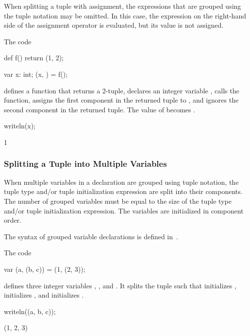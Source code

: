 When splitting a tuple with assignment, the expressions that are
grouped using the tuple notation may be omitted.  In this case, the
expression on the right-hand side of the assignment operator is
evaluated, but its value is not assigned.

\begin{example}
\begin{chapelpre}
\end{chapelpre}
The code
\begin{chapel}
def f()
  return (1, 2);

var x: int;
(x, ) = f();
\end{chapel}
defines a function that returns a 2-tuple, declares an integer
variable , calls the function, assigns the first component in
the returned tuple to , and ignores the second component in
the returned tuple.  The value of  becomes .
\begin{chapelpost}
writeln(x);
\end{chapelpost}
\begin{chapeloutput}
1
\end{chapeloutput}
\end{example}

\subsubsection{Splitting a Tuple into Multiple Variables}
\label{Variable_Declarations_in_a_Tuple}

When multiple variables in a declaration are grouped using tuple
notation, the tuple type and/or tuple initialization expression are
split into their components.  The number of grouped variables must be
equal to the size of the tuple type and/or tuple initialization
expression.  The variables are initialized in component order.

The syntax of grouped variable declarations is defined
in~.

\begin{example}
\begin{chapelpre}
\end{chapelpre}
The code
\begin{chapel}
var (a, (b, c)) = (1, (2, 3));
\end{chapel}
defines three integer variables , , and .  It
splits the tuple  such that 
initializes ,  initializes , and 
initializes .
\begin{chapelpost}
writeln((a, b, c));
\end{chapelpost}
\begin{chapeloutput}
(1, 2, 3)
\end{chapeloutput}
\end{example}

